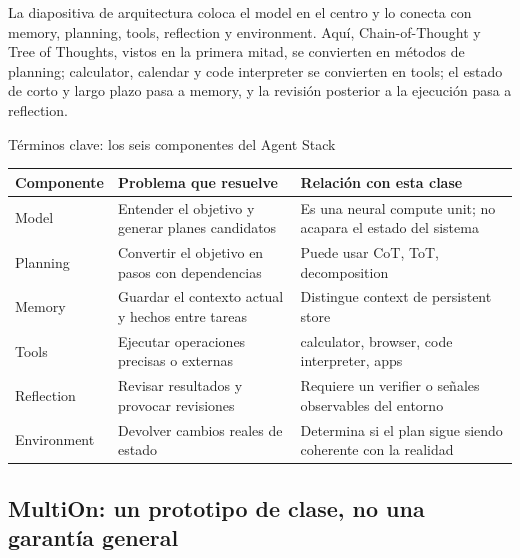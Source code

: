 La diapositiva de arquitectura coloca el model en el centro y lo conecta con memory, planning, tools, reflection y environment. Aquí, Chain-of-Thought y Tree of Thoughts, vistos en la primera mitad, se convierten en métodos de planning; calculator, calendar y code interpreter se convierten en tools; el estado de corto y largo plazo pasa a memory, y la revisión posterior a la ejecución pasa a reflection.


\begin{knowledgebox}{Términos clave: los seis componentes del Agent Stack}
\begin{tabularx}{\textwidth}{L{0.18\textwidth}>{\raggedright\arraybackslash}X >{\raggedright\arraybackslash}X}
\toprule
Componente & Problema que resuelve & Relación con esta clase \\
\midrule
Model & Entender el objetivo y generar planes candidatos & Es una neural compute unit; no acapara el estado del sistema \\
Planning & Convertir el objetivo en pasos con dependencias & Puede usar CoT, ToT, decomposition \\
Memory & Guardar el contexto actual y hechos entre tareas & Distingue context de persistent store \\
Tools & Ejecutar operaciones precisas o externas & calculator, browser, code interpreter, apps \\
Reflection & Revisar resultados y provocar revisiones & Requiere un verifier o señales observables del entorno \\
Environment & Devolver cambios reales de estado & Determina si el plan sigue siendo coherente con la realidad \\
\bottomrule
\end{tabularx}
\end{knowledgebox}


\subsection{MultiOn: un prototipo de clase, no una garantía general}

